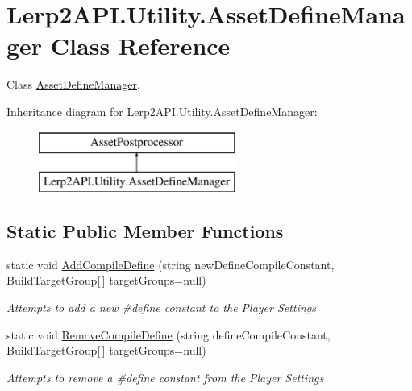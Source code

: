 \hypertarget{class_lerp2_a_p_i_1_1_utility_1_1_asset_define_manager}{}\section{Lerp2\+A\+P\+I.\+Utility.\+Asset\+Define\+Manager Class Reference}
\label{class_lerp2_a_p_i_1_1_utility_1_1_asset_define_manager}


Class \hyperlink{class_lerp2_a_p_i_1_1_utility_1_1_asset_define_manager}{Asset\+Define\+Manager}.  


Inheritance diagram for Lerp2\+A\+P\+I.\+Utility.\+Asset\+Define\+Manager\+:\begin{figure}[H]
\begin{center}
\leavevmode
\includegraphics[height=2.000000cm]{class_lerp2_a_p_i_1_1_utility_1_1_asset_define_manager}
\end{center}
\end{figure}
\subsection*{Static Public Member Functions}
\begin{DoxyCompactItemize}
\item 
static void \hyperlink{class_lerp2_a_p_i_1_1_utility_1_1_asset_define_manager_a28688c397b8b972e446b5522e657d467}{Add\+Compile\+Define} (string new\+Define\+Compile\+Constant, Build\+Target\+Group\mbox{[}$\,$\mbox{]} target\+Groups=null)
\begin{DoxyCompactList}\small\item\em Attempts to add a new \#define constant to the Player Settings \end{DoxyCompactList}\item 
static void \hyperlink{class_lerp2_a_p_i_1_1_utility_1_1_asset_define_manager_a3a1590728fc4b737b7ef2a69701a6a3e}{Remove\+Compile\+Define} (string define\+Compile\+Constant, Build\+Target\+Group\mbox{[}$\,$\mbox{]} target\+Groups=null)
\begin{DoxyCompactList}\small\item\em Attempts to remove a \#define constant from the Player Settings \end{DoxyCompactList}\end{DoxyCompactItemize}


